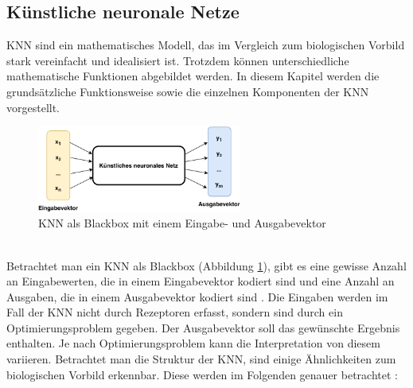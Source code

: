 \subsection{Künstliche neuronale Netze}
\ac{KNN} sind ein mathematisches Modell, das im Vergleich zum biologischen Vorbild stark vereinfacht und idealisiert ist. Trotzdem können unterschiedliche mathematische Funktionen abgebildet werden. In diesem Kapitel werden die grundsätzliche Funktionsweise sowie die einzelnen Komponenten der \ac{KNN} vorgestellt.
\begin{figure}[h]
	\centering
	\includegraphics[width=0.6\textwidth]{./img/neural_network_basics/NeuralNetworkBlackbox.pdf} 
	\caption{KNN als Blackbox mit einem Eingabe- und Ausgabevektor}
	\label{fig:neural_network_blackbox}
\end{figure}
\\ \noindent
Betrachtet man ein \ac{KNN} als Blackbox (Abbildung \ref{fig:neural_network_blackbox}), gibt es eine gewisse Anzahl an Eingabewerten, die in einem Eingabevektor kodiert sind und eine Anzahl an Ausgaben, die in einem Ausgabevektor kodiert sind \cite{scherer2013neuronale}. Die Eingaben werden im Fall der \ac{KNN} nicht durch Rezeptoren erfasst, sondern sind durch ein Optimierungsproblem gegeben. Der Ausgabevektor soll das gewünschte Ergebnis enthalten. Je nach Optimierungsproblem kann die Interpretation von diesem variieren. Betrachtet man die Struktur der \ac{KNN}, sind einige Ähnlichkeiten zum biologischen Vorbild erkennbar. Diese werden im Folgenden genauer betrachtet \cite{zell2003simulation}:

